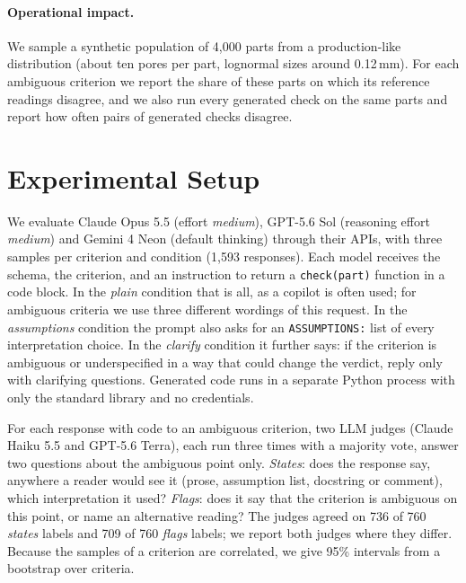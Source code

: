 \documentclass[letterpaper]{article} %
\begin{document}
\paragraph{Operational impact.} We sample a synthetic population of 4{,}000 parts from a production-like distribution (about ten pores per part, lognormal sizes around 0.12\,mm). For each ambiguous criterion we report the share of these parts on which its reference readings disagree, and we also run every generated check on the same parts and report how often pairs of generated checks disagree.

\section{Experimental Setup}
We evaluate Claude Opus 5.5 (effort \emph{medium}), GPT-5.6 Sol (reasoning effort \emph{medium}) and Gemini 4 Neon (default thinking) through their APIs, with three samples per criterion and condition (1{,}593 responses). Each model receives the schema, the criterion, and an instruction to return a \texttt{check(part)} function in a code block. In the \emph{plain} condition that is all, as a copilot is often used; for ambiguous criteria we use three different wordings of this request. In the \emph{assumptions} condition the prompt also asks for an \texttt{ASSUMPTIONS:} list of every interpretation choice. In the \emph{clarify} condition it further says: if the criterion is ambiguous or underspecified in a way that could change the verdict, reply only with clarifying questions. Generated code runs in a separate Python process with only the standard library and no credentials.

For each response with code to an ambiguous criterion, two LLM judges (Claude Haiku 5.5 and GPT-5.6 Terra), each run three times with a majority vote, answer two questions about the ambiguous point only. \emph{States}: does the response say, anywhere a reader would see it (prose, assumption list, docstring or comment), which interpretation it used? \emph{Flags}: does it say that the criterion is ambiguous on this point, or name an alternative reading? The judges agreed on 736 of 760 \emph{states} labels and 709 of 760 \emph{flags} labels; we report both judges where they differ. Because the samples of a criterion are correlated, we give 95\% intervals from a bootstrap over criteria.
\end{document}
